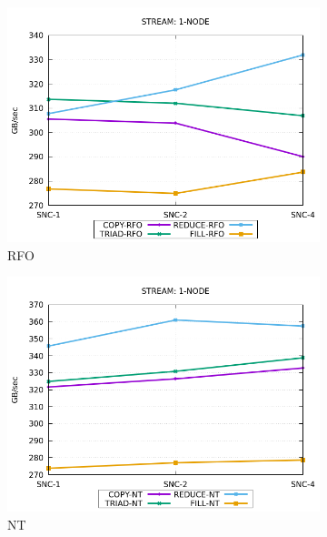 \documentclass{article}
\begin{document}
\begin{figure}[!hb]
    \centering
    \begin{subfigure}[!hb]{0.3\textwidth}
         \centering
         \includegraphics[width=\textwidth]{../data/icx-32c-snc/mem_bw_node/mb_node_rfo}
         \caption{RFO}
         \label{figure:mem_bw_node_rfo_icx_snc}
    \end{subfigure}
    \begin{subfigure}[!hb]{0.3\textwidth}
         \centering
         \includegraphics[width=\textwidth]{../data/icx-32c-snc/mem_bw_node/mb_node_nt}
         \caption{NT}
         \label{figure:mem_bw_node_nt_icx_snc}
    \end{subfigure}
    \begin{subfigure}[!hb]{0.3\textwidth}

\end{subfigure}
\end{figure}
\end{document}
